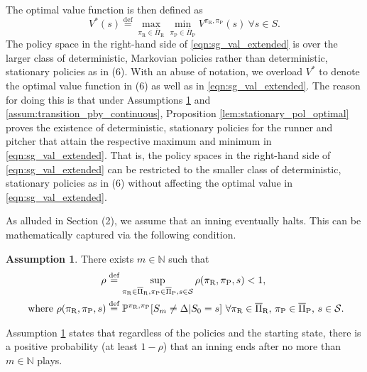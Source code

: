 \documentclass[aoas]{imsart}
\theoremstyle{plain}
\theoremstyle{definition}
\newtheorem{assumption}[theorem]{Assumption}
\newcommand{\defeq}{\stackrel{\text{def}}{=}}
\begin{document}
       The optimal value function is then defined as
       \begingroup
       \allowdisplaybreaks
       \begin{equation}
            \label{eqn:sg_val_extended}
            V^*(s) \defeq \max_{\pi_\text{R} \in \overline\Pi_\text{R}}\min_{\pi_\text{P} \in \overline\Pi_\text{P}}V^{\pi_\text{R},\pi_\text{P}}(s) \ \forall s \in S.
       \end{equation}
       \endgroup
       The policy space in the right-hand side of \eqref{eqn:sg_val_extended} is over the larger class of deterministic, Markovian policies rather than deterministic, stationary policies as in (6). With an abuse of notation, we overload $V^*$ to denote the optimal value function in (6) as well as in \eqref{eqn:sg_val_extended}. The reason for doing this is that under Assumptions \ref{assum:game_halts} and \ref{assum:transition_pby_continuous}, Proposition \ref{lem:stationary_pol_optimal} proves the existence of   deterministic, stationary policies for the runner and pitcher that attain the respective maximum and minimum in \eqref{eqn:sg_val_extended}. That is, the policy spaces in the right-hand side of \eqref{eqn:sg_val_extended} can be restricted to the smaller class of deterministic, stationary policies as in (6) without affecting the optimal value in \eqref{eqn:sg_val_extended}. 
        
       As alluded in Section (2), we assume that an inning eventually halts. This can be mathematically captured via the following condition.
       \begin{assumption}\label{assum:game_halts}
           There exists $m \in \mathbb{N}$ such that 
           \begingroup
           \allowdisplaybreaks
           \begin{align*}
                \rho &\defeq \sup_{\pi_\text{R} \in \overline\Pi_\text{R}, \pi_\text{P} \in \overline\Pi_\text{P}, s \in {\cal S}} \rho(\pi_\text{R},\pi_\text{P},s) < 1,\\
                \text{ where }       \rho(\pi_\text{R},\pi_\text{P},s) &\defeq \mathbb{P}^{\pi_\text{R}, \pi_\text{P}}[S_m \neq \Delta|S_0=s] \ \forall \pi_\text{R} \in \overline\Pi_\text{R}, \, \pi_\text{P} \in \overline\Pi_\text{P}, \, s \in {\cal S}.          
           \end{align*}
           \endgroup
       \end{assumption}
       \noindent Assumption \ref{assum:game_halts} states that regardless of the policies and the starting state, there is a positive probability (at least $1-\rho$) that an inning ends after no more than $m \in \mathbb{N}$ plays.
    
\end{document}

